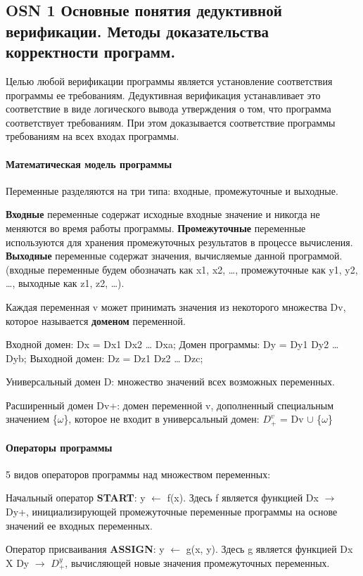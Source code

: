 \subsection{OSN 1 Основные понятия дедуктивной верификации. Методы доказательства корректности программ.}

Целью любой верификации программы является установление соответствия программы ее требованиям. Дедуктивная верификация устанавливает это соответствие в виде логического вывода утверждения о том, что программа соответствует требованиям. При этом доказывается соответствие программы требованиям на всех входах программы.
\paragraph{Математическая модель программы}

Переменные разделяются на три типа: входные, промежуточные и выходные.

\textbf{Входные} переменные содержат исходные входные значение и никогда не меняются во время работы программы. \textbf{Промежуточные} переменные используются для хранения промежуточных результатов в процессе вычисления. \textbf{Выходные} переменные содержат значения, вычисляемые данной программой.(входные переменные будем обозначать как x1, x2, …, промежуточные как y1, y2, …, выходные как z1, z2, …).

Каждая переменная v может принимать значения из некоторого множества Dv, которое называется \textbf{доменом} переменной.

Входной домен: Dx = Dx1  Dx2  …  Dxa; Домен программы: Dy = Dy1  Dy2  …  Dyb; Выходной домен: Dz = Dz1  Dz2  …  Dzc; 

Универсальный домен D: множество значений всех возможных переменных.

Расширенный домен Dv+: домен переменной v, дополненный специальным значением \{$\omega$\}, которое не входит в универсальный домен: $D^v_+$ = Dv $\cup$ \{$\omega$\}

\paragraph{Операторы программы}
5 видов операторов программы над множеством переменных:

Начальный оператор \textbf{START}: y $\leftarrow$  f(x). Здесь f является функцией Dx $\rightarrow$ Dy+, инициализирующей промежуточные переменные программы на основе значений ее входных переменных.

Оператор присваивания \textbf{ASSIGN}: y $\leftarrow$ g(x, y). Здесь g является функцией                 Dx X Dy $\rightarrow$ $D^y_+$, вычисляющей новые значения промежуточных переменных.

